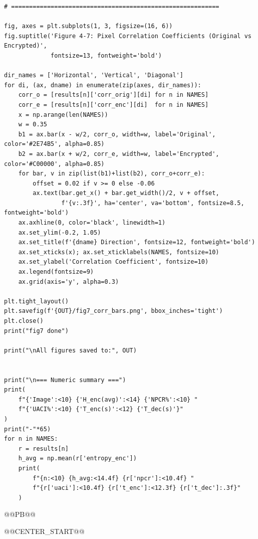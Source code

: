 \begin{verbatim}
# ==========================================================

fig, axes = plt.subplots(1, 3, figsize=(16, 6))
fig.suptitle('Figure 4-7: Pixel Correlation Coefficients (Original vs Encrypted)',
             fontsize=13, fontweight='bold')

dir_names = ['Horizontal', 'Vertical', 'Diagonal']
for di, (ax, dname) in enumerate(zip(axes, dir_names)):
    corr_o = [results[n]['corr_orig'][di] for n in NAMES]
    corr_e = [results[n]['corr_enc'][di]  for n in NAMES]
    x = np.arange(len(NAMES))
    w = 0.35
    b1 = ax.bar(x - w/2, corr_o, width=w, label='Original',  color='#2E74B5', alpha=0.85)
    b2 = ax.bar(x + w/2, corr_e, width=w, label='Encrypted', color='#C00000', alpha=0.85)
    for bar, v in zip(list(b1)+list(b2), corr_o+corr_e):
        offset = 0.02 if v >= 0 else -0.06
        ax.text(bar.get_x() + bar.get_width()/2, v + offset,
                f'{v:.3f}', ha='center', va='bottom', fontsize=8.5, fontweight='bold')
    ax.axhline(0, color='black', linewidth=1)
    ax.set_ylim(-0.2, 1.05)
    ax.set_title(f'{dname} Direction', fontsize=12, fontweight='bold')
    ax.set_xticks(x); ax.set_xticklabels(NAMES, fontsize=10)
    ax.set_ylabel('Correlation Coefficient', fontsize=10)
    ax.legend(fontsize=9)
    ax.grid(axis='y', alpha=0.3)

plt.tight_layout()
plt.savefig(f'{OUT}/fig7_corr_bars.png', bbox_inches='tight')
plt.close()
print("fig7 done")

print("\nAll figures saved to:", OUT)


print("\n=== Numeric summary ===")
print(
    f"{'Image':<10} {'H_enc(avg)':<14} {'NPCR%':<10} "
    f"{'UACI%':<10} {'T_enc(s)':<12} {'T_dec(s)'}"
)
print("-"*65)
for n in NAMES:
    r = results[n]
    h_avg = np.mean(r['entropy_enc'])
    print(
        f"{n:<10} {h_avg:<14.4f} {r['npcr']:<10.4f} "
        f"{r['uaci']:<10.4f} {r['t_enc']:<12.3f} {r['t_dec']:.3f}"
    )

\end{verbatim}





@@PB@@






@@CENTER_START@@


